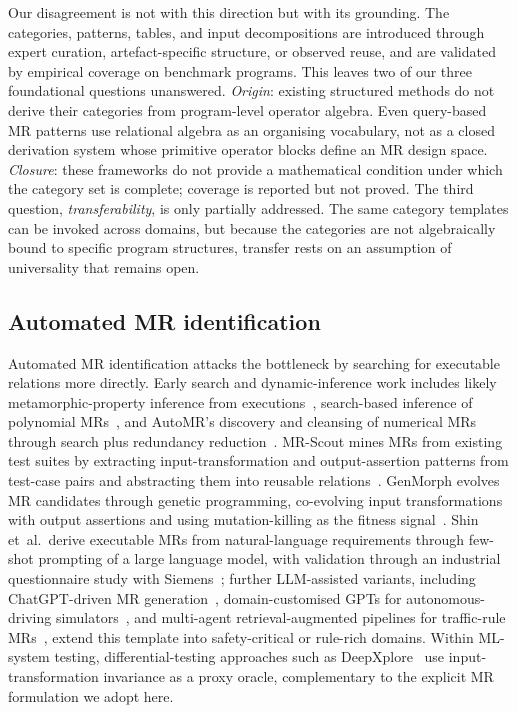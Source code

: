 \documentclass[manuscript]{acmart}
\begin{document}
Our disagreement is not with this direction but with its grounding. The categories, patterns, tables, and input decompositions are introduced through expert curation, artefact-specific structure, or observed reuse, and are validated by empirical coverage on benchmark programs. This leaves two of our three foundational questions unanswered. \emph{Origin}: existing structured methods do not derive their categories from program-level operator algebra. Even query-based MR patterns use relational algebra as an organising vocabulary, not as a closed derivation system whose primitive operator blocks define an MR design space. \emph{Closure}: these frameworks do not provide a mathematical condition under which the category set is complete; coverage is reported but not proved. The third question, \emph{transferability}, is only partially addressed. The same category templates can be invoked across domains, but because the categories are not algebraically bound to specific program structures, transfer rests on an assumption of universality that remains open.

\subsection{Automated MR identification}

Automated MR identification attacks the bottleneck by searching for executable relations more directly. Early search and dynamic-inference work includes likely metamorphic-property inference from executions~\cite{Su2015LikelyMR}, search-based inference of polynomial MRs~\cite{Zhang2014PolynomialMR}, and AutoMR's discovery and cleansing of numerical MRs through search plus redundancy reduction~\cite{Zhang2019AutoMR}. MR-Scout mines MRs from existing test suites by extracting input-transformation and output-assertion patterns from test-case pairs and abstracting them into reusable relations~\cite{MRScout2024}. GenMorph evolves MR candidates through genetic programming, co-evolving input transformations with output assertions and using mutation-killing as the fitness signal~\cite{GenMorph2024}. Shin et~al.\ derive executable MRs from natural-language requirements through few-shot prompting of a large language model, with validation through an industrial questionnaire study with Siemens~\cite{Shin2024}; further LLM-assisted variants, including ChatGPT-driven MR generation~\cite{ZhangChatGPTMR2023}, domain-customised GPTs for autonomous-driving simulators~\cite{GPTMR2025}, and multi-agent retrieval-augmented pipelines for traffic-rule MRs~\cite{AutoMT2025}, extend this template into safety-critical or rule-rich domains. Within ML-system testing, differential-testing approaches such as DeepXplore~\cite{DeepXplore2017} use input-transformation invariance as a proxy oracle, complementary to the explicit MR formulation we adopt here.
\end{document}

